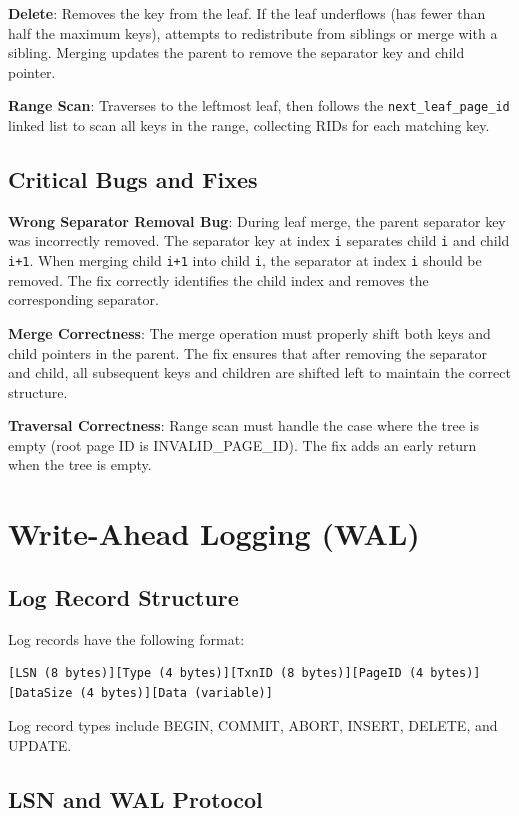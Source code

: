\documentclass{article}
\begin{document}
\textbf{Delete}: Removes the key from the leaf. If the leaf underflows (has fewer than half the maximum keys), attempts to redistribute from siblings or merge with a sibling. Merging updates the parent to remove the separator key and child pointer.

\textbf{Range Scan}: Traverses to the leftmost leaf, then follows the \texttt{next\_leaf\_page\_id} linked list to scan all keys in the range, collecting RIDs for each matching key.

\subsection{Critical Bugs and Fixes}

\textbf{Wrong Separator Removal Bug}: During leaf merge, the parent separator key was incorrectly removed. The separator key at index \texttt{i} separates child \texttt{i} and child \texttt{i+1}. When merging child \texttt{i+1} into child \texttt{i}, the separator at index \texttt{i} should be removed. The fix correctly identifies the child index and removes the corresponding separator.

\textbf{Merge Correctness}: The merge operation must properly shift both keys and child pointers in the parent. The fix ensures that after removing the separator and child, all subsequent keys and children are shifted left to maintain the correct structure.

\textbf{Traversal Correctness}: Range scan must handle the case where the tree is empty (root page ID is INVALID\_PAGE\_ID). The fix adds an early return when the tree is empty.

\section{Write-Ahead Logging (WAL)}

\subsection{Log Record Structure}

Log records have the following format:
\begin{verbatim}
[LSN (8 bytes)][Type (4 bytes)][TxnID (8 bytes)][PageID (4 bytes)][DataSize (4 bytes)][Data (variable)]
\end{verbatim}

Log record types include BEGIN, COMMIT, ABORT, INSERT, DELETE, and UPDATE.

\subsection{LSN and WAL Protocol}
\end{document}
